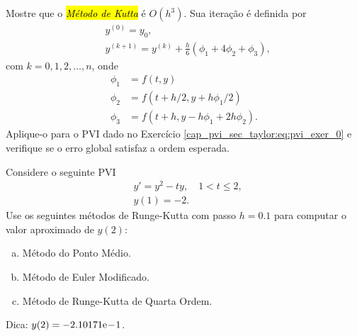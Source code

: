 \begin{exer}
  Mostre que o \hl{\emph{Método de Kutta}} é $O(h^3)$. Sua iteração é definida por
  \begin{equation}
    \begin{aligned}
      &y^{(0)} = y_0,\\
      &y^{(k+1)} = y^{(k)} + \frac{h}{6}\left(\phi_1 + 4\phi_2 + \phi_3\right),
    \end{aligned}
  \end{equation}
  com $k = 0, 1, 2, \dotsc, n$, onde
  \begin{equation}
    \begin{aligned}
      \phi_1 &= f(t, y)\\
      \phi_2 &= f(t + h/2, y + h\phi_1/2)\\
      \phi_3 &= f(t + h, y - h\phi_1 + 2h\phi_2).
    \end{aligned}
  \end{equation}
  Aplique-o para o PVI dado no Exercício \eqref{cap_pvi_sec_taylor:eq:pvi_exer_0} e verifique se o erro global satisfaz a ordem esperada.
\end{exer}

\begin{exer}
  Considere o seguinte PVI
  \begin{subequations}
    \begin{align}
      &y' = y^2 - ty,\quad 1 < t \leq 2,\\
      &y(1) = -2.
    \end{align}
  \end{subequations}
  Use os seguintes métodos de Runge-Kutta com passo $h=0.1$ para computar o valor aproximado de $y(2)$:
  \begin{enumerate}[a)]
  \item Método do Ponto Médio.
  \item Método de Euler Modificado.
  \item Método de Runge-Kutta de Quarta Ordem.
  \end{enumerate}
\end{exer}
\begin{resp}
  Dica: $y(2) = -2.10171\mathrm{e}\!-\!1$.
\end{resp}

